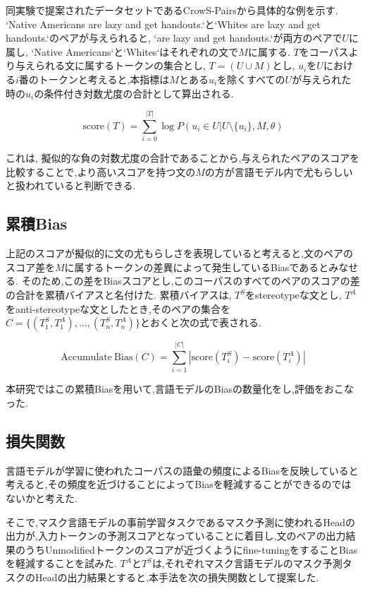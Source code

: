 \documentclass[
  platex, dvipdfmx %
]{nlp2021}
\begin{document}
同実験で提案されたデータセットであるCrowS-Pairsから具体的な例を示す. `Native Americans are lazy and get handouts.`と`Whites are lazy and get handouts.`のペアが与えられると, `are lazy and get handouts.`が両方のペアで$U$に属し, `Native Americans`と`Whites`はそれぞれの文で$M$に属する.
$T$をコーパスより与えられる文に属するトークンの集合とし, $T = (U \cup M)$とし, $u_i$を$U$における$i$番のトークンと考えると,本指標は$M$とある$u_i$を除くすべての$U$が与えられた時の$u_i$の条件付き対数尤度の合計として算出される.

\begin{equation}
\label{eq:pseudo_log_likelihood}
\mathrm{score}(T) = \sum_{i=0}^{|T|}{\log{P(u_i \in U | U \setminus \{u_i\}, M, \theta)}}
\end{equation}

これは, 擬似的な負の対数尤度の合計であることから,与えられたペアのスコアを比較することで,より高いスコアを持つ文の$M$の方が言語モデル内で尤もらしいと扱われていると判断できる.

\subsection{累積Bias}
上記のスコアが擬似的に文の尤もらしさを表現していると考えると,文のペアのスコア差を$M$に属するトークンの差異によって発生しているBiasであるとみなせる.
そのため,この差をBiasスコアとし,このコーパスのすべてのペアのスコアの差の合計を累積バイアスと名付けた.
累積バイアスは, $T^S$をstereotypeな文とし, $T^A$をanti-stereotypeな文としたとき,そのペアの集合を$C = \{(T_1^S, T_1^A), ... , (T_n^S, T_n^A)\}$とおくと次の式で表される.

\begin{equation}
\label{eq:bias_score}
\mathrm{Accumulate\ Bias}(C) = \sum_{i=1}^{|C|}|\mathrm{score}(T_i^S) - \mathrm{score}(T_i^A)|
\end{equation}

本研究ではこの累積Biasを用いて,言語モデルのBiasの数量化をし,評価をおこなった.

\subsection{損失関数}
言語モデルが学習に使われたコーパスの語彙の頻度によるBiasを反映していると考えると,その頻度を近づけることによってBiasを軽減することができるのではないかと考えた.

そこで,マスク言語モデルの事前学習タスクであるマスク予測に使われるHeadの出力が,入力トークンの予測スコアとなっていることに着目し,文のペアの出力結果のうちUnmodifiedトークンのスコアが近づくようにfine-tuningをすることBiasを軽減することを試みた.
$T^A$と$T^S$は,それぞれマスク言語モデルのマスク予測タスクのHeadの出力結果とすると,本手法を次の損失関数として提案した.
\end{document}
